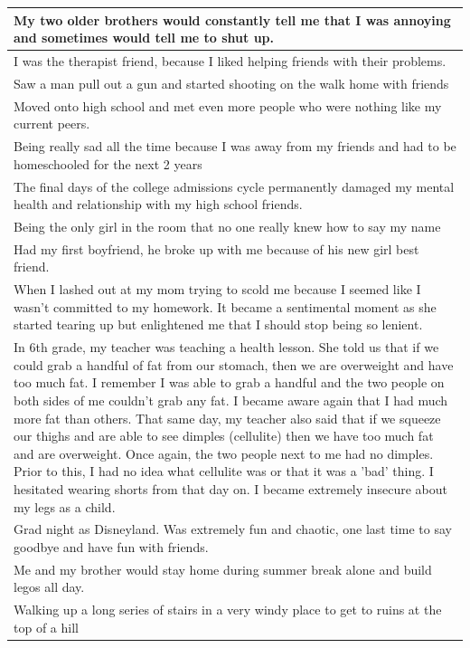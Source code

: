 \documentclass[
  .7em,
  letterpaper,
  DIV=11,
  numbers=noendperiod]{scrartcl}
\begin{document}
\begin{table}
\begin{tabular}{l}
\hline
My two older brothers would constantly tell me that I was annoying and sometimes would tell me to shut up.\\
\hline
I was the therapist friend, because I liked helping friends with their problems.\\
\hline
Saw a man pull out a gun and started shooting on the walk home with friends\\
\hline
Moved onto high school and met even more people who were nothing like my current peers.\\
\hline
Being really sad all the time because I was away from my friends and had to be homeschooled for the next 2 years\\
\hline
The final days of the college admissions cycle permanently damaged my mental health and relationship with my high school friends.\\
\hline
Being the only girl in the room that no one really knew how to say my name\\
\hline
Had my first boyfriend, he broke up with me because of his new girl best friend.\\
\hline
When I lashed out at my mom trying to scold me because I seemed like I wasn't committed to my homework. It became a sentimental moment as she started tearing up but enlightened me that I should stop being so lenient.\\
\hline
In 6th grade, my teacher was teaching a health lesson. She told us that if we could grab a handful of fat from our stomach, then we are overweight and have too much fat. I remember I was able to grab a handful and the two people on both sides of me couldn't grab any fat. I became aware again that I had much more fat than others. That same day, my teacher also said that if we squeeze our thighs and are able to see dimples (cellulite) then we have too much fat and are overweight. Once again, the two people next to me had no dimples. Prior to this, I had no idea what cellulite was or that it was a 'bad' thing. I hesitated wearing shorts from that day on. I became extremely insecure about my legs as a child.\\
\hline
Grad night as Disneyland. Was extremely fun and chaotic, one last time to say goodbye and have fun with friends.\\
\hline
Me and my brother would stay home during summer break alone and build legos all day.\\
\hline
Walking up a long series of stairs in a very windy place to get to ruins at the top of a hill\\

\end{tabular}
\end{table}
\end{document}
